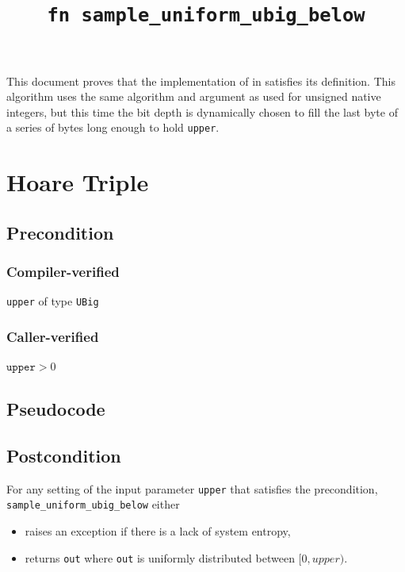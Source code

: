 \documentclass{article}
\title{\texttt{fn sample\_uniform\_ubig\_below}}
\author{\MichaelShoemateAuthor}
\begin{document}
\maketitle

This document proves that the implementation of  in 
satisfies its definition.
This algorithm uses the same algorithm and argument as used for unsigned native integers,
but this time the bit depth is dynamically chosen to fill the last byte of a series of bytes long enough to hold \texttt{upper}.

\section{Hoare Triple}
\subsection*{Precondition}
\subsubsection*{Compiler-verified}
\texttt{upper} of type \texttt{UBig}

\subsubsection*{Caller-verified}
$\texttt{upper} > 0$

\subsection*{Pseudocode}



\subsection*{Postcondition}
\begin{theorem}
For any setting of the input parameter \texttt{upper} that satisfies the precondition,
\texttt{sample\_uniform\_ubig\_below} either
\begin{itemize}
    \item raises an exception if there is a lack of system entropy,
    \item returns \texttt{out} where \texttt{out} is uniformly distributed between $[0, upper)$.
\end{itemize}
\end{theorem}
\end{document}
